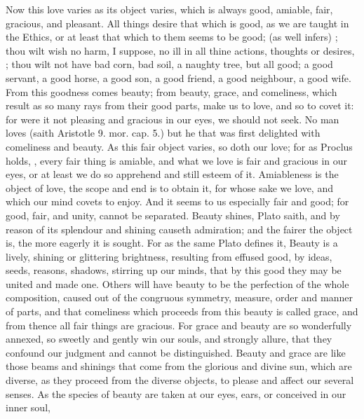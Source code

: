 {Now this love varies as its object varies, which is always good,
amiable, fair, gracious, and pleasant. All things desire that
which is good, as we are taught in the Ethics, or at least that which
to them seems to be good;  (as \Austin{} well infers)
; thou wilt wish no harm, I
suppose, no ill in all thine actions, thoughts or desires, ; thou wilt not have bad corn, bad soil, a naughty tree, but
all good; a good servant, a good horse, a good son, a good friend, a
good neighbour, a good wife. From this goodness comes beauty; from
beauty, grace, and comeliness, which result as so many rays from their
good parts, make us to love, and so to covet it: for were it not
pleasing and gracious in our eyes, we should not seek. No man
loves (saith Aristotle 9. mor. cap. 5.) but he that was first delighted
with comeliness and beauty. As this fair object varies, so doth our
love; for as Proclus holds, , every fair thing is
amiable, and what we love is fair and gracious in our eyes, or at least
we do so apprehend and still esteem of it.  Amiableness is the
object of love, the scope and end is to obtain it, for whose sake we
love, and which our mind covets to enjoy. And it seems to us especially
fair and good; for good, fair, and unity, cannot be separated. Beauty
shines, Plato saith, and by reason of its splendour and shining causeth
admiration; and the fairer the object is, the more eagerly it is
sought. For as the same Plato defines it, Beauty is a lively,
shining or glittering brightness, resulting from effused good, by
ideas, seeds, reasons, shadows, stirring up our minds, that by this
good they may be united and made one. Others will have beauty to be the
perfection of the whole composition, caused out of the congruous
symmetry, measure, order and manner of parts, and that comeliness which
proceeds from this beauty is called grace, and from thence all fair
things are gracious. For grace and beauty are so wonderfully annexed,
so sweetly and gently win our souls, and strongly allure, that
they confound our judgment and cannot be distinguished. Beauty and
grace are like those beams and shinings that come from the glorious and
divine sun, which are diverse, as they proceed from the diverse
objects, to please and affect our several senses. As the species
of beauty are taken at our eyes, ears, or conceived in our inner soul,
}
